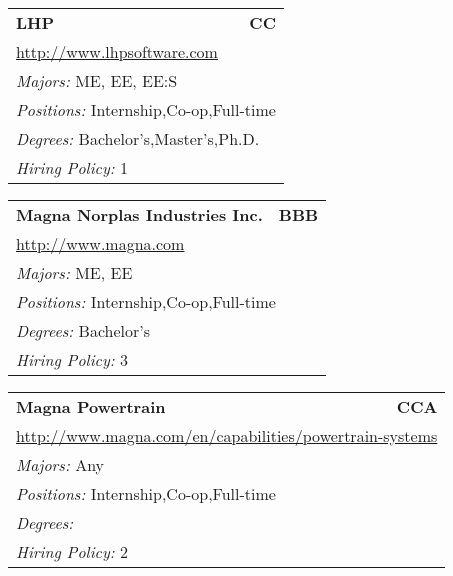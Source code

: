 \documentclass[twoside]{article}
\begin{document}
\begin{center}
\begin{multicols}{3}
\begin{FlushLeft}
\begin{minipage}{\columnwidth}
\end{minipage}
 
\begin{minipage}{\columnwidth}\begin{tabularx}{.95\columnwidth}{Xr}
                 {\Large\bf LHP} & {\Large\bf CC}\\
    \multicolumn{2}{p{.95\columnwidth}}{\url{http://www.lhpsoftware.com}}\\
    \multicolumn{2}{p{.95\columnwidth}}{\emph{Majors:} ME, EE, EE:S}\\
    \multicolumn{2}{p{.95\columnwidth}}{\emph{Positions:} Internship,Co-op,Full-time}\\
    \multicolumn{2}{p{.95\columnwidth}}{\emph{Degrees:} Bachelor's,Master's,Ph.D.}\\
    \multicolumn{2}{p{.95\columnwidth}}{\emph{Hiring Policy:} 1}\\
    \end{tabularx}
    
\end{minipage}
 
\begin{minipage}{\columnwidth}\begin{tabularx}{.95\columnwidth}{Xr}
                 {\Large\bf Magna Norplas Industries Inc.} & {\Large\bf BBB}\\
    \multicolumn{2}{p{.95\columnwidth}}{\url{http://www.magna.com}}\\
    \multicolumn{2}{p{.95\columnwidth}}{\emph{Majors:} ME, EE}\\
    \multicolumn{2}{p{.95\columnwidth}}{\emph{Positions:} Internship,Co-op,Full-time}\\
    \multicolumn{2}{p{.95\columnwidth}}{\emph{Degrees:} Bachelor's}\\
    \multicolumn{2}{p{.95\columnwidth}}{\emph{Hiring Policy:} 3}\\
    \end{tabularx}
    
\end{minipage}
 
\begin{minipage}{\columnwidth}\begin{tabularx}{.95\columnwidth}{Xr}
                 {\Large\bf Magna Powertrain} & {\Large\bf CCA}\\
    \multicolumn{2}{p{.95\columnwidth}}{\url{http://www.magna.com/en/capabilities/powertrain-systems}}\\
    \multicolumn{2}{p{.95\columnwidth}}{\emph{Majors:} Any}\\
    \multicolumn{2}{p{.95\columnwidth}}{\emph{Positions:} Internship,Co-op,Full-time}\\
    \multicolumn{2}{p{.95\columnwidth}}{\emph{Degrees:} }\\
    \multicolumn{2}{p{.95\columnwidth}}{\emph{Hiring Policy:} 2}\\
    \end{tabularx}
    

\end{minipage}
\end{FlushLeft}
\end{multicols}
\end{center}
\end{document}
